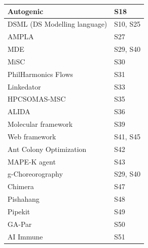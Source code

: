 \documentclass{article}
\begin{document}
\begin{multicols}{2}
\begin{table}[ht!]
\begin{center}
\begin{tabular}{ | m{20em} | m{20em} | }
Autogenic                                    & S18                                        \\ \hline
DSML (DS Modelling language)                 & S10,   S25                                 \\ \hline
AMPLA                                        & S27                                        \\ \hline
MDE                                          & S29,   S40                                 \\ \hline
MiSC                                         & S30                                        \\ \hline
PhilHarmonics   Flows                        & S31                                        \\ \hline
Linkedator                                   & S33                                        \\ \hline
HPCSOMAS-MSC                                 & S35                                        \\ \hline
ALIDA                                        & S36                                        \\ \hline
Molecular   framework                        & S39                                        \\ \hline
Web   framework                              & S41,   S45                                 \\ \hline
Ant   Colony Optimization                    & S42                                        \\ \hline
MAPE-K   agent                               & S43                                        \\ \hline
g-Choreorography                             & S29,   S40                                 \\ \hline
Chimera                                      & S47                                        \\ \hline
Pishahang                                    & S48                                        \\ \hline
Pipekit                                      & S49                                        \\ \hline
GA-Par                                       & S50                                        \\ \hline
AI   Immune                                  & S51                                        \\ \hline

\end{tabular}
\end{center}
\end{table}
\end{multicols}
\end{document}
